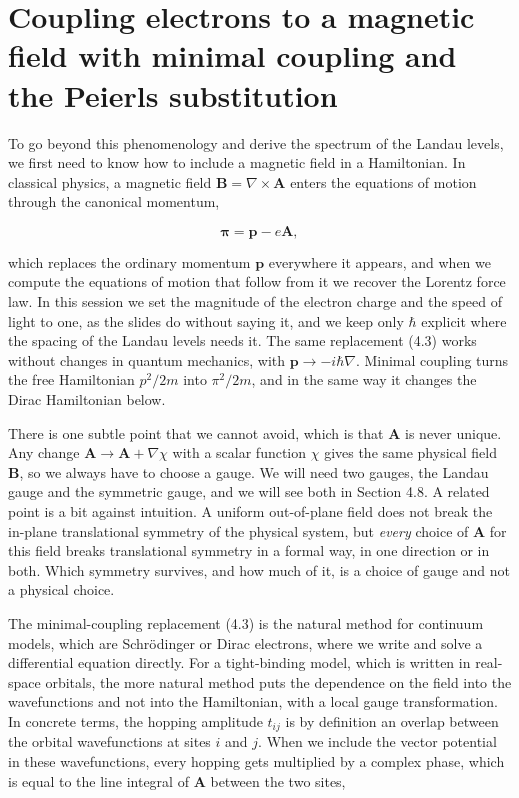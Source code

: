 \section{Coupling electrons to a magnetic field with minimal coupling and the Peierls substitution}

To go beyond this phenomenology and derive the spectrum of the Landau levels, we first need to
know how to include a magnetic field in a Hamiltonian. In classical physics, a magnetic field
$\mathbf{B} = \nabla\times\mathbf{A}$ enters the equations of motion through the canonical
momentum,

\begin{equation}
\boldsymbol{\pi} = \mathbf{p} - e\mathbf{A},
\end{equation}

which replaces the ordinary momentum $\mathbf{p}$ everywhere it appears, and when we compute the
equations of motion that follow from it we recover the Lorentz force law. In this session we set
the magnitude of the electron charge and the speed of light to one, as the slides do without
saying it, and we keep only $\hbar$ explicit where the spacing of the Landau levels needs it. The
same replacement (4.3) works without changes in quantum mechanics, with
$\mathbf{p}\to-i\hbar\nabla$. Minimal coupling turns the free Hamiltonian $p^2/2m$ into
$\pi^2/2m$, and in the same way it changes the Dirac Hamiltonian below.

There is one subtle point that we cannot avoid, which is that $\mathbf{A}$ is never unique. Any
change $\mathbf{A}\to\mathbf{A}+\nabla\chi$ with a scalar function $\chi$ gives the same physical
field $\mathbf{B}$, so we always have to choose a gauge. We will need two gauges, the Landau gauge
and the symmetric gauge, and we will see both in Section 4.8. A related point is a bit against
intuition. A uniform out-of-plane field does not break the in-plane translational symmetry of the
physical system, but \emph{every} choice of $\mathbf{A}$ for this field breaks translational
symmetry in a formal way, in one direction or in both. Which symmetry survives, and how much of it,
is a choice of gauge and not a physical choice.

The minimal-coupling replacement (4.3) is the natural method for continuum models, which are
Schrödinger or Dirac electrons, where we write and solve a differential equation directly. For a
tight-binding model, which is written in real-space orbitals, the more natural method puts the
dependence on the field into the wavefunctions and not into the Hamiltonian, with a local gauge
transformation. In concrete terms, the hopping amplitude $t_{ij}$ is by definition an overlap
between the orbital wavefunctions at sites $i$ and $j$. When we include the vector potential in
these wavefunctions, every hopping gets multiplied by a complex phase, which is equal to the line
integral of $\mathbf{A}$ between the two sites,

